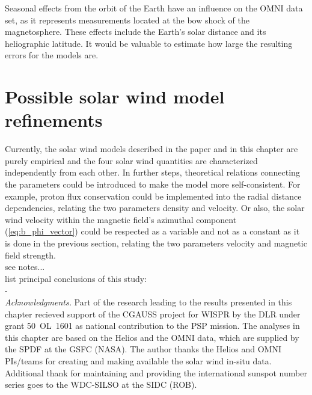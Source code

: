 Seasonal effects from the orbit of the Earth have an influence on the OMNI data set, as it represents measurements located at the bow shock of the magnetosphere. These effects include the Earth's solar distance and its heliographic latitude. It would be valuable to estimate how large the resulting errors for the models are.


\section{Possible solar wind model refinements}
Currently, the solar wind models described in the paper and in this chapter are purely empirical and the four solar wind quantities are characterized independently from each other. In further steps, theoretical relations connecting the parameters could be introduced to make the model more self-consistent. For example, proton flux conservation could be implemented into the radial distance dependencies, relating the two parameters density and velocity. Or also, the solar wind velocity within the magnetic field's azimuthal component (\autoref{eq:b_phi_vector}) could be respected as a variable and not as a constant as it is done in the previous section, relating the two parameters velocity and magnetic field strength.\\

see notes...\\


list principal conclusions of this study:\\
- \\



\bigskip
{\small
\noindent \textit{Acknowledgments.} Part of the research leading to the results presented in this chapter recieved support of the CGAUSS project for WISPR by the DLR under grant 50~OL~1601 as national contribution to the PSP mission.
The analyses in this chapter are based on the Helios and the OMNI data, which are supplied by the SPDF at the GSFC (NASA). The author thanks the Helios and OMNI PIs/teams for creating and making available the solar wind in-situ data. Additional thank for maintaining and providing the international sunspot number series goes to the WDC-SILSO at the SIDC (ROB).
}


